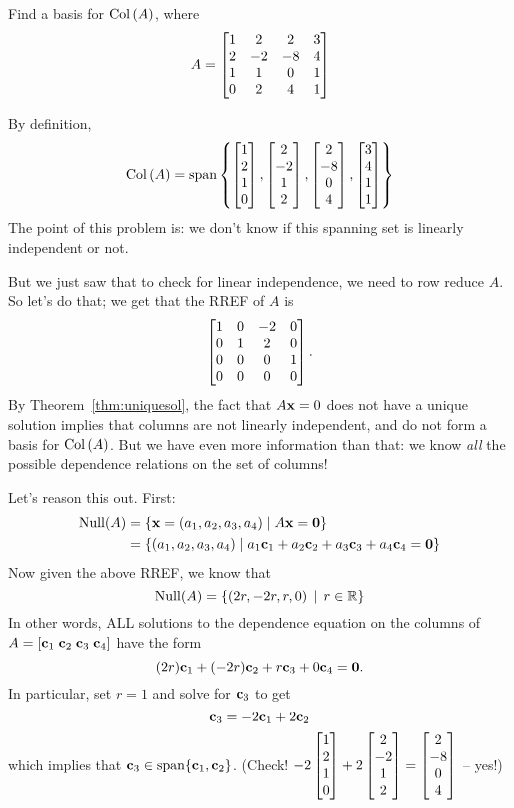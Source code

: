 \begin{myprob} Find a basis for $\operatorname{Col\,}(A)$, where 
$$A = \left[ \begin{matrix} 
1&2&2&3\\2&-2&-8&4\\1&1&0&1\\0&2&4&1 \end{matrix} \right]
$$
 
\begin{mysol} By definition, 
$$
\operatorname{Col\,}(A) = \textrm{span}\left\{ \left[ \begin{matrix} 1\\2\\1\\0 \end{matrix} \right], \left[ \begin{matrix} 2\\-2\\1\\2 \end{matrix} \right], \left[ \begin{matrix} 2\\-8\\0\\4 \end{matrix} \right],
\left[ \begin{matrix} 3\\4\\1\\1 \end{matrix} \right] \right\}
$$
The point of this problem is:  we don't know if this spanning set is linearly
independent or not.   

But we just saw that to check for linear independence, we need to 
row reduce $A$.  So let's do that;  we get that the RREF of $A$ is
$$
\left[ \begin{matrix} 1 & 0 & -2 & 0\\ 0 & 1 & 2 & 0\\ 0 & 0 & 0 & 1\\ 0 & 0 & 0 & 0 \end{matrix} \right].
$$
By Theorem~\ref{thm:uniquesol}, the fact that $A\mathbf{x}=0$ does not have a unique solution 
implies that columns are not linearly independent, and do not form  a
basis for $\operatorname{Col\,}(A)$.  But we have even more information than that:  we know {\it all}
the possible dependence relations on the set of columns!

Let's reason this out.  First:
\begin{align*}
\operatorname{Null}(A) &= \{ \mathbf{x} = (a_1, a_2,a_3,a_4) \mid A\mathbf{x} = \mathbf{0}\}\\
 &= \{ (a_1, a_2, a_3, a_4) \mid a_1\mathbf{c}_1 + a_2\mathbf{c}_2 + a_3\mathbf{c}_3+a_4\mathbf{c}_4 = \mathbf{0} \}
\end{align*}
Now given the above RREF, we know that
$$
\operatorname{Null}(A) = \{ (2r,-2r,r,0)\,\mid \, r\in \mathbb{R} \}
$$
In other words, ALL solutions to the dependence equation on the columns
of $A = [\mathbf{c}_1 \; \mathbf{c}_2 \; \mathbf{c}_3 \; \mathbf{c}_4]$ have the form
$$
(2r)\mathbf{c}_1 + (-2r)\mathbf{c}_2 + r\mathbf{c}_3+0\mathbf{c}_4 = \mathbf{0}.
$$
In particular, set $r=1$ and solve for $\mathbf{c}_3$ to get
$$
\mathbf{c}_3 = -2\mathbf{c}_1 + 2\mathbf{c}_2
$$
which implies that $\mathbf{c}_3 \in \textrm{span}\{\mathbf{c}_1, \mathbf{c}_2\}$.
(Check!  $-2 \left[ \begin{matrix} 1\\2\\1\\0 \end{matrix} \right] +2\left[ \begin{matrix} 2\\-2\\1\\2 \end{matrix} \right] = \left[ \begin{matrix} 2\\-8\\0\\4 \end{matrix} \right]$ -- yes!)


\end{mysol}
\end{myprob}
